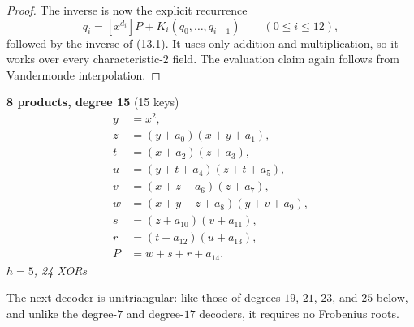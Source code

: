 \begin{proof}
The inverse is now the explicit recurrence
\[
 q_i=[x^{d_i}]P+K_i(q_0,\ldots,q_{i-1})\qquad(0\le i\le12),
\]
followed by the inverse of (13.1).  It uses only addition and multiplication,
so it works over every characteristic-$2$ field.  The evaluation claim again
follows from Vandermonde interpolation.
\end{proof}

\medskip
\noindent
\begin{minipage}[t]{\textwidth}
\textbf{8 products, degree 15} (15 keys)
\[
\begin{aligned}
y &= x^2, \\
z &= (y+a_0)(x+y+a_1), \\
t &= (x+a_2)(z+a_3), \\
u &= (y+t+a_4)(z+t+a_5), \\
v &= (x+z+a_6)(z+a_7), \\
w &= (x+y+z+a_8)(y+v+a_9), \\
s &= (z+a_{10})(v+a_{11}), \\
r &= (t+a_{12})(u+a_{13}), \\
P &= w+s+r+a_{14}.
\end{aligned}
\]
\emph{$h=5$, 24 XORs}
\end{minipage}

\smallskip
\noindent
The next decoder is unitriangular: like those of degrees $19$, $21$, $23$,
and $25$ below, and unlike the degree-$7$ and degree-$17$ decoders, it
requires no Frobenius roots.

